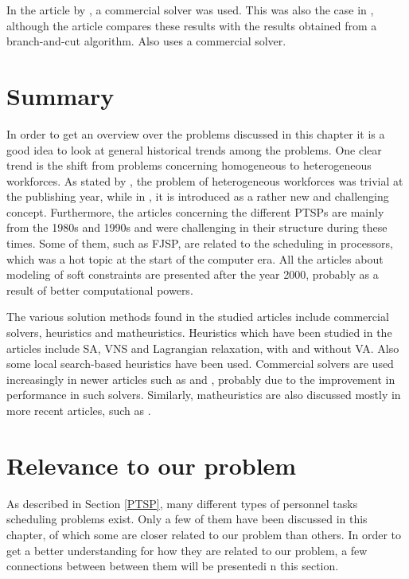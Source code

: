 In the article by \citet{eiselt_2008}, a commercial solver was used. This was also the case in \citet{mohan_2008}, although the article compares these results with the results obtained from a branch-and-cut algorithm. Also \cite{shahnazari_2013} uses a commercial solver.

\section{Summary}

In order to get an overview over the problems discussed in this chapter it is a good idea to look at general historical trends among the problems. One clear trend is the shift from problems concerning homogeneous to heterogeneous workforces. As stated by \citet{krishnamoorthy_2012}, the problem of heterogeneous workforces was trivial at the publishing year, while in \citet{loucks_1991}, it is introduced as a rather new and challenging concept. Furthermore, the articles concerning the different PTSPs are mainly from the 1980s and 1990s and were challenging in their structure during these times. Some of them, such as FJSP, are related to the scheduling in processors, which was a hot topic at the start of the computer era. All the articles about modeling of soft constraints are presented after the year 2000, probably as a result of better computational powers.

The various solution methods found in the studied articles include commercial solvers, heuristics and matheuristics. Heuristics which have been studied in the articles include SA, VNS and Lagrangian relaxation, with and without VA. Also some local search-based heuristics have been used. Commercial solvers are used increasingly in newer articles such as \citet{hojati_2011} and \citet{mohan_2008}, probably due to the improvement in performance in such solvers. Similarly, matheuristics are also discussed mostly in more recent articles, such as \citet{akbari_2013}. 

\section{Relevance to our problem}

As described in Section \ref{PTSP}, many different types of personnel tasks scheduling problems exist. Only a few of them have been discussed in this chapter, of which some are closer related to our problem than others. In order to get a better understanding for how they are related to our problem, a few connections between between them will be presentedi n this section.

